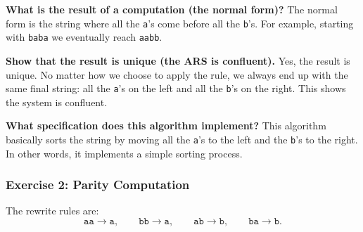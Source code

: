 \documentclass{article}
\theoremstyle{plain}
\theoremstyle{definition}
\theoremstyle{remark}
\begin{document}
\textbf{What is the result of a computation (the normal form)?}
The normal form is the string where all the \texttt{a}'s come before all the \texttt{b}'s. For example, starting with \texttt{baba} we eventually reach \texttt{aabb}.

\textbf{Show that the result is unique (the ARS is confluent).}
Yes, the result is unique. No matter how we choose to apply the rule, we always end up with the same final string: all the \texttt{a}'s on the left and all the \texttt{b}'s on the right. This shows the system is confluent.

\textbf{What specification does this algorithm implement?}
This algorithm basically sorts the string by moving all the \texttt{a}'s to the left and the \texttt{b}'s to the right. In other words, it implements a simple sorting process.

\subsubsection{Exercise 2: Parity Computation}

The rewrite rules are:
\[
\texttt{aa} \to \texttt{a},\qquad
\texttt{bb} \to \texttt{a},\qquad
\texttt{ab} \to \texttt{b},\qquad
\texttt{ba} \to \texttt{b}.
\]
\end{document}
